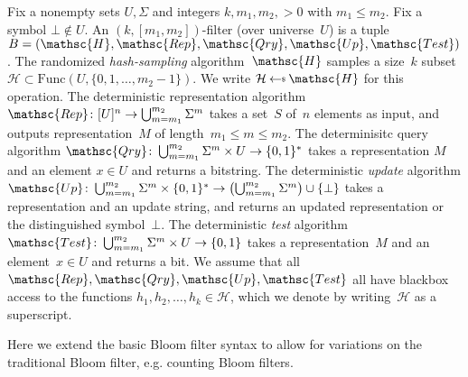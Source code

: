 Fix a nonempty sets $U,\Sigma$ and integers $k,m_1,m_2,>0$ with $m_1 \leq m_2$.  Fix a symbol $\bot \not\in U$.  An $(k,[m_1,m_2])$-filter (over universe~$U$) is a tuple  $B=(\mathsc{H},\mathsc{Rep},\mathsc{Qry},\mathsc{Up}, \mathsc{Test})$.   
%
The randomized \emph{hash-sampling} algorithm~$\mathsc{H}$ samples a size~$k$ subset~$\mathcal{H} \subset \mathrm{Func}(U,\{0,1,\ldots,m_2-1\})$.  We write $\mathcal{H} \getsr \mathsc{H}$ for this operation.
%
The deterministic representation algorithm $\mathsc{Rep}\colon [U]^n \rightarrow \bigcup_{m=m_1}^{m_2}\Sigma^m$ takes a set~$S$ of~$n$ elements as input, and outputs representation~$M$ of length~$m_1 \leq m \leq m_2$.
%
The determinisitc query algorithm $\mathsc{Qry}\colon \bigcup_{m=m_1}^{m_2}\Sigma^m \times U \rightarrow \bits^*$ takes a representation $M$ and an element $x \in U$ and returns a bitstring.  
%
The deterministic \emph{update} algorithm $\mathsc{Up}\colon \bigcup_{m=m_1}^{m_2}\Sigma^m \times \bits^* \rightarrow \left(\bigcup_{m=m_1}^{m_2}\Sigma^m \right) \cup \{\bot\}$ takes a representation and an update string, and returns an updated representation or the distinguished symbol~$\bot$. 
%
The deterministic \emph{test} algorithm $\mathsc{Test} \colon \bigcup_{m=m_1}^{m_2}\Sigma^m \times U \rightarrow \bits$ takes a representation~$M$ and an element~$x \in U$ and returns a bit.
%
We assume that all $\mathsc{Rep},\mathsc{Qry},\mathsc{Up},\mathsc{Test}$ all have blackbox access to the functions $h_1,h_2,\ldots,h_k \in \mathcal{H}$, which we denote by writing~$\mathcal{H}$ as a superscript.   






Here we extend the basic Bloom filter syntax to allow for variations on the traditional Bloom filter, e.g. counting Bloom filters.  

